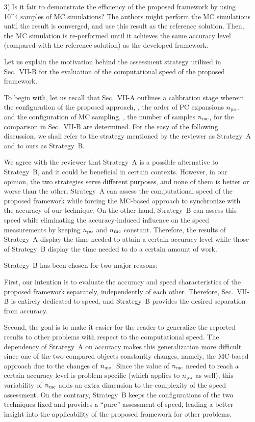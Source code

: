 \begin{reviewer}
3).Is it fair to demonstrate the efficiency of the proposed framework by using 10\^{}4 samples of MC simulations? The authors might perform the MC simulations until the result is converged, and use this result as the reference solution. Then, the MC simulation is re-performed until it achieves the same accuracy level (compared with the reference solution) as the developed framework.
\end{reviewer}
\begin{authors}
Let us explain the motivation behind the assessment strategy utilized in Sec.~VII-B for the evaluation of the computational speed of the proposed framework.

To begin with, let us recall that Sec.~VII-A outlines a calibration stage wherein the configuration of the proposed approach, \ie, the order of PC expansions ${n_\text{po}}$, and the configuration of MC sampling, \ie, the number of samples ${n_\text{mc}}$, for the comparison in Sec.~VII-B are determined.
For the easy of the following discussion, we shall refer to the strategy mentioned by the reviewer as Strategy~A and to ours as Strategy~B.

We agree with the reviewer that Strategy~A is a possible alternative to Strategy~B, and it could be beneficial in certain contexts.
However, in our opinion, the two strategies serve different purposes, and none of them is better or worse than the other.
Strategy~A can assess the computational speed of the proposed framework while forcing the MC-based approach to synchronize with the accuracy of our technique.
On the other hand, Strategy~B can assess this speed while eliminating the accuracy-induced influence on the speed measurements by keeping ${n_\text{po}}$ and ${n_\text{mc}}$ constant.
Therefore, the results of Strategy~A display the time needed to attain a certain accuracy level while those of Strategy~B display the time needed to do a certain amount of work.

Strategy~B has been chosen for two major reasons:

First, our intention is to evaluate the accuracy and speed characteristics of the proposed framework separately, independently of each other.
Therefore, Sec.~VII-B is entirely dedicated to speed, and Strategy~B provides the desired separation from accuracy.

Second, the goal is to make it easier for the reader to generalize the reported results to other problems with respect to the computational speed.
The dependency of Strategy~A on accuracy makes this generalization more difficult since one of the two compared objects constantly changes, namely, the MC-based approach due to the changes of ${n_\text{mc}}$.
Since the value of ${n_\text{mc}}$ needed to reach a certain accuracy level is problem specific (which applies to ${n_\text{po}}$ as well), this variability of ${n_\text{mc}}$ adds an extra dimension to the complexity of the speed assessment.
On the contrary, Strategy~B keeps the configurations of the two techniques fixed and provides a ``pure'' assessment of speed, leading a better insight into the applicability of the proposed framework for other problems.


\end{authors}
